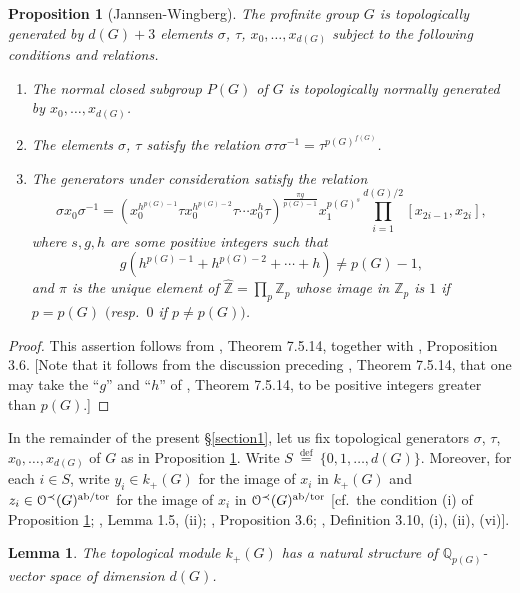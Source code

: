 \documentclass[11pt,showkeys]{article}
\theoremstyle{theorem}
\newtheorem{prop}[theorem]{Proposition}
\newtheorem{lem}[theorem]{Lemma}
\theoremstyle{definition}
\def\bZ{{\mathbb Z}}
\def\bQ{{\mathbb Q}}
\def\CalO{{\mathcal O}}
\def\defeq{ \ {\stackrel{\mathrm{def}}{=}} \ }
\begin{document}
\begin{prop}[Jannsen-Wingberg]\label{proposition:1.1} 
The profinite group $G$ is topologically generated by $d(G)+3$ elements $\sigma$, $\tau$, $x_0, \dots, x_{d(G)}$ subject to the following conditions and relations.

\begin{enumerate}[label=(\roman*),ref=(\roman*)]
  \item[\rm (i)] The normal closed subgroup $P(G)$ of $G$ is topologically normally generated by $x_0, \dots, x_{d(G)}$.
  \item[\rm (ii)] The elements $\sigma$, $\tau$ satisfy the relation $\sigma \tau \sigma^{-1} = \tau^{p(G)^{f(G)}}$.
  \item[\rm (iii)] The generators under consideration satisfy the relation 
\[
\sigma x_0 \sigma^{-1}
=
(x^{h^{{p(G)}-1}}_0 \tau x^{h^{{p(G)}-2}}_0 \tau \cdots x^{h}_0 \tau)^{\frac{\pi g}{{p(G)}-1}}
x_1^{p(G)^{s}}
\prod_{i=1}^{d(G)/2} [x_{2i-1},x_{2i}] ,
\]
where $s, g, h$ are some positive integers such that 
\[
g(h^{p(G) - 1} + h^{p(G) - 2} + \cdots + h) \neq p(G) - 1, 
\]
and $\pi$ is the unique element of $\hat{\bZ} = \prod_p \bZ_p$ whose image in $\bZ_p$ is $1$ if $p = p(G)$ $($resp.\ $0$ if $p\neq p(G)$$)$.  
\end{enumerate}
\end{prop}
\begin{proof}
This assertion follows from \cite{NSW}, Theorem 7.5.14, together with \cite{Hoshi1}, Proposition 3.6. [Note that it follows from the discussion preceding \cite{NSW}, Theorem 7.5.14, that one may take the ``$g$'' and ``$h$'' of \cite{NSW}, Theorem 7.5.14, to be positive integers greater than $p(G)$.]  
\end{proof}

In the remainder of the present \S \ref{section1}, let us fix 
topological generators $\sigma$, $\tau$, $x_0, \dots, x_{d(G)}$ of 
$G$ as in Proposition \ref{proposition:1.1}. Write $S \defeq \{0, 
1, \dots, d(G)\}$. Moreover, for each $i \in S$, write $y_i \in k_+(G)$ 
for the image of $x_i$ in $k_+(G)$ and $z_i \in \CalO^{\prec}(G)^{\rm ab/tor}$ for the image 
of $x_i$ in $\CalO^{\prec}(G)^{\rm ab/tor}$ [cf.\ the condition (i) of Proposition \ref{proposition:1.1}; 
\cite{Hoshi1}, Lemma 1.5, (ii); \cite{Hoshi1}, Proposition 3.6; 
\cite{Hoshi1}, Definition 3.10, (i), (ii), (vi)]. 

\begin{lem}\label{lemma:1.2} 
 The topological module $k_{+}(G)$ has a natural structure of ${\bQ}_{p(G)}$-vector space of dimension $d(G)$. 
\end{lem}
\end{document}
